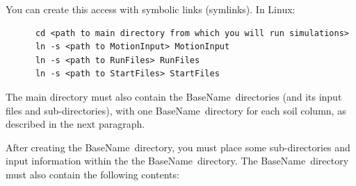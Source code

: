 \documentclass[letterpaper,11pt]{article}
\newcommand{\BaseName}{\textsf{BaseName}}
\begin{document}
    You can create this access with symbolic links (symlinks).
    In Linux:
    \begin{verbatim}
      cd <path to main directory from which you will run simulations>
      ln -s <path to MotionInput> MotionInput
      ln -s <path to RunFiles> RunFiles
      ln -s <path to StartFiles> StartFiles
    \end{verbatim}
    The main directory must also contain the
    \BaseName\ directories (and its input
    files and sub-di\-rec\-tor\-ies),
    with one \BaseName\ directory
    for each soil column, as described in the next
    paragraph.
    \par
    After creating the \BaseName\ directory,
    you must place some sub-di\-rec\-tor\-ies
    and input information within the
    the \BaseName\ directory.
    The \BaseName\ directory must also contain the following
    contents:
\end{document}
